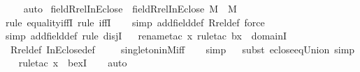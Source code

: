 \begin{isabellebody}
\ \ \isamarkupfalse%
\ auto%
\endisatagproof
{\isafoldproof}%
%
\isadelimproof
\isanewline
%
\endisadelimproof
\isanewline
{}\isamarkupfalse%
\ field{\isacharunderscore}{\kern0pt}Rrel{\isacharunderscore}{\kern0pt}InEclose\ {\isacharcolon}{\kern0pt}\ {\isachardoublequoteopen}field{\isacharparenleft}{\kern0pt}Rrel{\isacharparenleft}{\kern0pt}InEclose{\isacharcomma}{\kern0pt}\ M{\isacharparenright}{\kern0pt}{\isacharparenright}{\kern0pt}\ {\isacharequal}{\kern0pt}\ M{\isachardoublequoteclose}\ \isanewline
%
\isadelimproof
\ \ %
\endisadelimproof
%
\isatagproof
{}\isamarkupfalse%
{\isacharparenleft}{\kern0pt}rule\ equality{\isacharunderscore}{\kern0pt}iffI{\isacharcomma}{\kern0pt}\ rule\ iffI{\isacharparenright}{\kern0pt}\isanewline
\ \ \ \isamarkupfalse%
{\isacharparenleft}{\kern0pt}simp\ add{\isacharcolon}{\kern0pt}field{\isacharunderscore}{\kern0pt}def\ Rrel{\isacharunderscore}{\kern0pt}def{\isacharcomma}{\kern0pt}\ force{\isacharparenright}{\kern0pt}\isanewline
\ \ \isamarkupfalse%
{\isacharparenleft}{\kern0pt}simp\ add{\isacharcolon}{\kern0pt}field{\isacharunderscore}{\kern0pt}def{\isacharcomma}{\kern0pt}\ rule\ disjI{}{\isacharparenright}{\kern0pt}\isanewline
\ \ \isamarkupfalse%
{\isacharparenleft}{\kern0pt}rename{\isacharunderscore}{\kern0pt}tac\ x{\isacharcomma}{\kern0pt}\ rule{\isacharunderscore}{\kern0pt}tac\ b{\isacharequal}{\kern0pt}{\isachardoublequoteopen}{\isacharbraceleft}{\kern0pt}x{\isacharbraceright}{\kern0pt}{\isachardoublequoteclose}\ \ domainI{\isacharparenright}{\kern0pt}\isanewline
\ \ \isamarkupfalse%
\ Rrel{\isacharunderscore}{\kern0pt}def\ InEclose{\isacharunderscore}{\kern0pt}def\ \isanewline
\ \ \isamarkupfalse%
\ singleton{\isacharunderscore}{\kern0pt}in{\isacharunderscore}{\kern0pt}M{\isacharunderscore}{\kern0pt}iff\isanewline
\ \ \isamarkupfalse%
\ simp\isanewline
\ \ \isamarkupfalse%
{\isacharparenleft}{\kern0pt}subst\ eclose{\isacharunderscore}{\kern0pt}eq{\isacharunderscore}{\kern0pt}Union{\isacharcomma}{\kern0pt}\ simp{\isacharparenright}{\kern0pt}\isanewline
\ \ \isamarkupfalse%
{\isacharparenleft}{\kern0pt}rule{\isacharunderscore}{\kern0pt}tac\ x{\isacharequal}{\kern0pt}{}\ \ bexI{\isacharparenright}{\kern0pt}\isanewline
\ \ \isamarkupfalse%
\ auto%
\endisatagproof
{\isafoldproof}%
%
\isadelimproof
\isanewline
%
\endisadelimproof
\isanewline
{}\isamarkupfalse%

\end{isabellebody}
